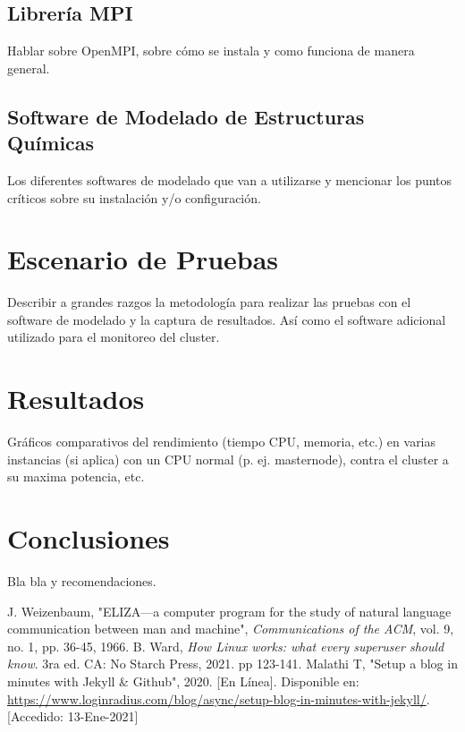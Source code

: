 \documentclass[journal]{IEEEtran}
\begin{document}
\subsection{Librería MPI}

Hablar sobre OpenMPI, sobre cómo se instala y como funciona de manera general.

\subsection{Software de Modelado de Estructuras Químicas}

Los diferentes softwares de modelado que van a utilizarse y mencionar los puntos críticos sobre su instalación y/o configuración.

\section{Escenario de Pruebas}

Describir a grandes razgos la metodología para realizar las pruebas con el software de modelado y la captura de resultados. Así como el software adicional utilizado para el monitoreo del cluster.

\section{Resultados}

Gráficos comparativos del rendimiento (tiempo CPU, memoria, etc.) en varias instancias (si aplica) con un CPU normal (p. ej. masternode), contra el cluster a su maxima potencia, etc.

\section{Conclusiones}

Bla bla y recomendaciones.

\begin{thebibliography}{10}
	J. Weizenbaum,
	"ELIZA—a computer program for the study of natural language communication between man and machine",
	\textit{Communications of the ACM},
	vol. 9,
	no. 1,
	pp. 36-45,
	1966.
	B. Ward,
	\textit{How Linux works: what every superuser should know}.
	3ra ed.
	CA: No Starch Press,
	2021.
	pp 123-141.
	Malathi T,
	"Setup a blog in minutes with Jekyll \& Github",
	2020.
	[En Línea].
	Disponible en: \url{https://www.loginradius.com/blog/async/setup-blog-in-minutes-with-jekyll/}.
	[Accedido: 13-Ene-2021]
\end{thebibliography}
\end{document}
